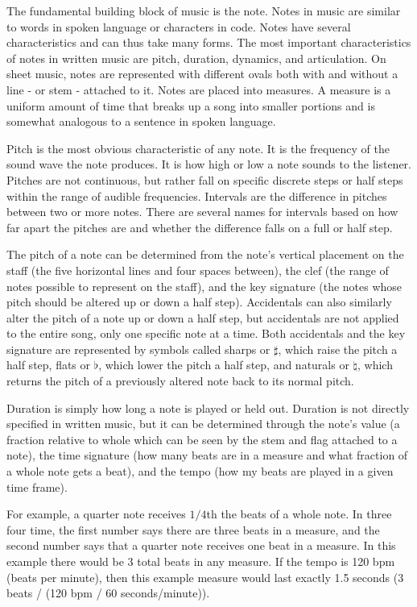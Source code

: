 \documentclass[10pt,preprint]{sigplanconf}
\begin{document}
{The fundamental building block of music is the note. Notes in music are similar to words in spoken language or characters in code. Notes have several characteristics and can thus take many forms. The most important characteristics of notes in written music are pitch, duration, dynamics, and articulation. On sheet music, notes are represented with different ovals both with and without a line - or stem - attached to it. Notes are placed into measures. A measure is a uniform amount of time that breaks up a song into smaller portions and is somewhat analogous to a sentence in spoken language.

Pitch is the most obvious characteristic of any note. It is the frequency of the sound wave the note produces. It is how high or low a note sounds to the listener. Pitches are not continuous, but rather fall on specific discrete steps or half steps within the range of audible frequencies. Intervals are the difference in pitches between two or more notes. There are several names for intervals based on how far apart the pitches are and whether the difference falls on a full or half step.

The pitch of a note can be determined from the note's vertical placement on the staff (the five horizontal lines and four spaces between), the clef (the range of notes possible to represent on the staff), and the key signature (the notes whose pitch should be altered up or down a half step). Accidentals can also similarly alter the pitch of a note up or down a half step, but accidentals are not applied to the entire song, only one specific note at a time. Both accidentals and the key signature are represented by symbols called sharps or $\sharp$, which raise the pitch a half step, flats or $\flat$, which lower the pitch a half step, and naturals or $\natural$, which returns the pitch of a previously altered note back to its normal pitch.

Duration is simply how long a note is played or held out. Duration is not directly specified in written music, but it can be determined through the note's value (a fraction relative to whole which can be seen by the stem and flag attached to a note), the time signature (how many beats are in a measure and what fraction of a whole note gets a beat), and the tempo (how my beats are played in a given time frame).

For example, a quarter note receives $1/4$th the beats of a whole note. In three four time, the first number says there are three beats in a measure, and the second number says that a quarter note receives one beat in a measure. In this example there would be 3 total beats in any measure. If the tempo is 120 bpm (beats per minute), then this example measure would last exactly 1.5 seconds (3 beats / (120 bpm / 60 seconds/minute)).

}
\end{document}

